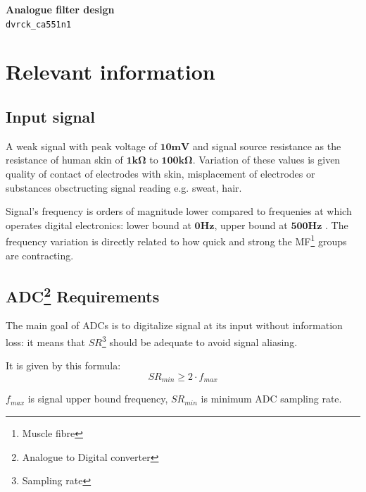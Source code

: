 \documentclass[a4paper, 10pt]{article} %
\newcommand{\mathbff}[1]{$\boldsymbol{#1}$}
\newcommand{\parenciteit}[2]{\textit{\parencite[#1]{#2}}} %
\begin{document}
    \begin{titlepage}
        \begin{center}
            \Large\textbf{Analogue filter design}\\
            \large\texttt{dvrck\_ca551n1}
        \end{center}
    \end{titlepage}

    \section*{Relevant information}

    \subsection*{Input signal}
    \hspace{\parindent}A weak signal with peak voltage of \mathbff{10mV} \parenciteit{p435}{Naik} \parenciteit{p1}{Xiaoou} and signal source resistance as the resistance of human skin of \mathbff{1k\Omega} to \mathbff{100k\Omega}. Variation of these values is given quality of contact of electrodes with skin, misplacement of electrodes or substances obsctructing signal reading e.g. sweat, hair.
    
    \noindent Signal's frequency is orders of magnitude lower compared to frequenies at which operates digital electronics: lower bound at \mathbff{0Hz}, upper bound at \mathbff{500Hz} \parenciteit{p1}{Xiaoou}\parenciteit{p2}{MerlettiMuceli}. The frequency variation is directly related to how quick and strong the MF\footnote{Muscle fibre} groups are contracting. \parenciteit{p2}{MerlettiMuceli}

    \subsection*{ADC\footnote{Analogue to Digital converter} Requirements}
    \hspace{\parindent}The main goal of ADCs is to digitalize signal at its input without information loss: it means that \begin{math}SR\end{math}\footnote{Sampling rate} should be adequate to avoid signal aliasing.
    
    \noindent It is given by this formula: $$SR_{min} \geq 2 \cdot f_{max}$$
    \begin{center}
        \small{$f_{max}$ is signal upper bound frequency, $SR_{min}$ is minimum ADC sampling rate.}
    \end{center}
    
\end{document}
